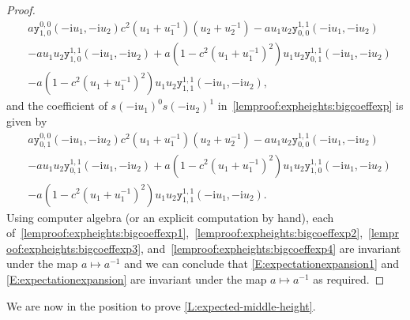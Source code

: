 \documentclass[11pt,twoside]{amsart}
\theoremstyle{plain}
\numberwithin{quest}{section}
\theoremstyle{remark}
\numberwithin{rem}{section}
\theoremstyle{definition}
\begin{document}
\begin{proof}
\begin{equation}
\begin{split}
				&a \mathtt{y}_{1,0}^{0,0}(-\mathrm{i}u_1,-\mathrm{i}u_2) c^2(u_1+u_1^{-1})(u_2+u_2^{-1})-au_1 u_2\mathtt{y}_{0,0}^{1,1}(-\mathrm{i}u_1,-\mathrm{i}u_2)\\
				&-a u_1 u_2\mathtt{y}_{1,0}^{1,1}(-\mathrm{i}u_1,-\mathrm{i}u_2)+a(1-c^2(u_1+u_1^{-1})^2)u_1u_2\mathtt{y}_{0,1}^{1,1}(-\mathrm{i}u_1,-\mathrm{i}u_2)\\
				&-a(1-c^2(u_1+u_1^{-1})^2)u_1u_2\mathtt{y}_{1,1}^{1,1}(-\mathrm{i}u_1,-\mathrm{i}u_2),
			\end{split}
		\end{equation}
		and the coefficient of $s(-\mathrm{i}u_1)^0s(-\mathrm{i}u_2)^1$ in~\eqref{lemproof:expheights:bigcoeffexp} is given by 
		\begin{equation}
			\begin{split}\label{lemproof:expheights:bigcoeffexp4}
				&a \mathtt{y}_{0,1}^{0,0}(-\mathrm{i}u_1,-\mathrm{i}u_2) c^2(u_1+u_1^{-1})(u_2+u_2^{-1})-au_1 u_2\mathtt{y}_{0,0}^{1,1}(-\mathrm{i}u_1,-\mathrm{i}u_2)\\
				&-a u_1 u_2\mathtt{y}_{0,1}^{1,1}(-\mathrm{i}u_1,-\mathrm{i}u_2)+a(1-c^2(u_1+u_1^{-1})^2)u_1u_2\mathtt{y}_{1,0}^{1,1}(-\mathrm{i}u_1,-\mathrm{i}u_2)\\
				&-a(1-c^2(u_1+u_1^{-1})^2)u_1u_2\mathtt{y}_{1,1}^{1,1}(-\mathrm{i}u_1,-\mathrm{i}u_2).
			\end{split}
		\end{equation}
		Using computer algebra (or an explicit computation by hand), each of~\eqref{lemproof:expheights:bigcoeffexp1},~\eqref{lemproof:expheights:bigcoeffexp2},~\eqref{lemproof:expheights:bigcoeffexp3}, and~\eqref{lemproof:expheights:bigcoeffexp4} are invariant under the map $a \mapsto a^{-1}$ and we can conclude that \eqref{E:expectationexpansion1} and \eqref{E:expectationexpansion} are invariant under the map $a \mapsto a^{-1}$ as required. \end{proof}
	
	We are now in the position to prove \cref{L:expected-middle-height}.
	
\end{document}
